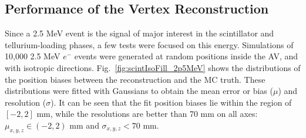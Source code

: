 \subsection{Performance of the Vertex Reconstruction}

Since a 2.5 MeV event is the signal of major interest in the scintillator and tellurium-loading phases, a few tests were focused on this energy. Simulations of 10,000 2.5 MeV $e^-$ events were generated at random positions inside the AV, and with isotropic directions. Fig.~\ref{fig:scintIsoFill_2p5MeV} shows the distributions of the position biases between the reconstruction and the MC truth. These distributions were fitted with Gaussians to obtain the mean error or bias ($\mu$) and resolution ($\sigma$). It can be seen that the fit position biases lie within the region of $[-2,2]$ mm, while the resolutions are better than 70 mm on all axes: $\mu_{x,y,z}\in(-2,2)$ mm and $\sigma_{x,y,z}<70$ mm.

